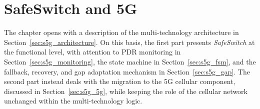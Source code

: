 \chapter{SafeSwitch and 5G}
\label{ch:safeswitch_5g}

The chapter opens with a description of the multi-technology architecture in Section~\ref{sec:s5g_architecture}. On this basis, the first part presents \emph{SafeSwitch} at the functional level, with attention to PDR monitoring in Section~\ref{sec:s5g_monitoring}, the state machine in Section~\ref{sec:s5g_fsm}, and the fallback, recovery, and gap adaptation mechanism in Section~\ref{sec:s5g_gap}. The second part instead deals with the migration to the 5G cellular component, discussed in Section~\ref{sec:s5g_5g}, while keeping the role of the cellular network unchanged within the multi-technology logic.







